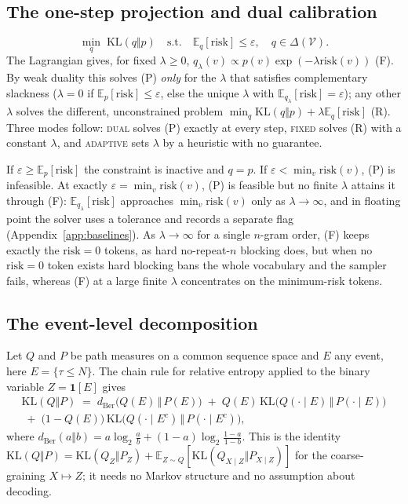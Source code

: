 \documentclass[11pt]{article}
\newcommand{\risk}{\mathrm{risk}}
\newcommand{\KL}{\mathrm{KL}}
\newcommand{\E}{\mathbb{E}}
\begin{document}
\subsection{The one-step projection and dual calibration}
\begin{equation}
  \min_q \; \KL(q\Vert p) \quad \text{s.t.} \quad \E_q[\risk]\le\varepsilon,\quad q\in\Delta(\mathcal{V}). \tag{P}
\end{equation}
The Lagrangian gives, for fixed $\lambda\ge0$, $q_\lambda(v)\propto p(v)\exp(-\lambda\risk(v))$ (F). By weak duality this solves (P) \emph{only} for the $\lambda$ that satisfies complementary slackness ($\lambda{=}0$ if $\E_p[\risk]\le\varepsilon$, else the unique $\lambda$ with $\E_{q_\lambda}[\risk]=\varepsilon$); any other $\lambda$ solves the different, unconstrained problem $\min_q\KL(q\Vert p)+\lambda\E_q[\risk]$ (R). Three modes follow: \textsc{dual} solves (P) exactly at every step, \textsc{fixed} solves (R) with a constant $\lambda$, and \textsc{adaptive} sets $\lambda$ by a heuristic with no guarantee.

If $\varepsilon\ge\E_p[\risk]$ the constraint is inactive and $q{=}p$. If $\varepsilon<\min_v\risk(v)$, (P) is infeasible. At exactly $\varepsilon=\min_v\risk(v)$, (P) is feasible but no finite $\lambda$ attains it through (F): $\E_{q_\lambda}[\risk]$ approaches $\min_v\risk(v)$ only as $\lambda\to\infty$, and in floating point the solver uses a tolerance and records a separate flag (Appendix~\ref{app:baselines}). As $\lambda\to\infty$ for a single $n$-gram order, (F) keeps exactly the $\risk{=}0$ tokens, as hard no-repeat-$n$ blocking does, but when no $\risk{=}0$ token exists hard blocking bans the whole vocabulary and the sampler fails, whereas (F) at a large finite $\lambda$ concentrates on the minimum-risk tokens.

\subsection{The event-level decomposition}
\label{ssec:bernoulli-bound}
Let $Q$ and $P$ be path measures on a common sequence space and $E$ any event, here $E=\{\tau\le N\}$. The chain rule for relative entropy applied to the binary variable $Z=\mathbf{1}[E]$ gives
\begin{multline*}
  \KL(Q\Vert P) \;=\; d_{\mathrm{Ber}}\bigl(Q(E)\,\Vert\,P(E)\bigr) \;+\; Q(E)\,\KL\bigl(Q(\cdot\mid E)\,\Vert\,P(\cdot\mid E)\bigr) \\
  \;+\; \bigl(1-Q(E)\bigr)\,\KL\bigl(Q(\cdot\mid E^c)\,\Vert\,P(\cdot\mid E^c)\bigr),
\end{multline*}
where $d_{\mathrm{Ber}}(a\Vert b)=a\log_2\frac{a}{b}+(1-a)\log_2\frac{1-a}{1-b}$. This is the identity $\KL(Q\Vert P)=\KL(Q_Z\Vert P_Z)+\E_{Z\sim Q}[\KL(Q_{X\mid Z}\Vert P_{X\mid Z})]$ for the coarse-graining $X\mapsto Z$; it needs no Markov structure and no assumption about decoding.
\end{document}
